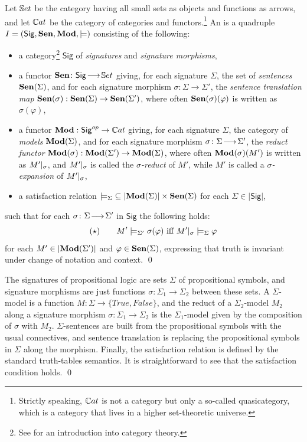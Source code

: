 \documentclass[10pt,fleqn,final]{scrreprt}
\newcommand{\cbs}[0]{\color{red}\xspace} %
\newcommand{\cbe}[0]{\color{black}\xspace} %
\newcommand{\Sig}{\mathsf{Sig}}
\newenvironment{definitions}[0]{\medskip }{}
\begin{document}
\begin{definitions}
\begin{definition}\label{def:inst} \cbs Let $\mathbb{S}et$ be the
category having all small \textsc{}sets as objects and functions as
arrows, and let $\mathbb{C}at$ be the category
of categories and functors.\footnote {Strictly speaking, $\mathbb{C}at$ is not a
category but only a so-called quasicategory, which is a category that
lives in a higher set-theoretic universe.}\cbe
An
 \cite{GoguenBurstall92} is a quadruple $I=(\Sig,\sen,\IMod,{\models})$
consisting of the following:
%
\begin{itemize}
\item a category\footnote{See \cite{AHS,MacLane} for an introduction into category theory.} $\Sig$ of \emph{signatures} and \emph{signature morphisms},
\item a functor $\sen\map{\Sig}{\Set}$  giving, for each signature $\Sigma$, the set of
\emph{sentences} $\mathbf {Sen}(\Sigma)$, and for each signature morphism
$\sigma:{\Sigma}\to{\Sigma'}$, the \emph{sentence translation map}
$\mathbf {Sen}(\sigma):{\mathbf {Sen}(\Sigma)}\to{\mathbf {Sen}(\Sigma')}$, where often
$\mathbf {Sen}(\sigma)(\varphi)$ is written as $\sigma(\varphi)$, \item a
functor $\IMod:{\Sig^{op}}\to{\Cat}$ giving, for each signature
$\Sigma$, the category of \emph{models} $\mathbf{Mod}(\Sigma)$, and for each
signature morphism $\sigma\colon\Sigma\!\longrightarrow\!\Sigma'$, the \emph{reduct
functor\/} $\mathbf{Mod}(\sigma):{\mathbf{Mod}(\Sigma')}\to {\mathbf{Mod}(\Sigma)}$, where
often $\mathbf{Mod}(\sigma)(M')$ is written as $M'|_{\sigma}$, and
$M'|_{\sigma}$ is called the \emph{$\sigma$-reduct} of $M'$,
while $M'$ is called a \emph{$\sigma$-expansion} of
$M'|_{\sigma}$,
\item a satisfaction relation
${\models_{\Sigma}}\subseteq|{\mathbf{Mod}(\Sigma)|\times\mathbf {Sen}(\Sigma)}$ for
each $\Sigma\in |\Sig|$,
\end{itemize}
%
such that for each $\sigma\colon\Sigma\!\longrightarrow\!\Sigma'$ in $\Sig$ the following  holds:
$$
(\star) \qquad M'\models_{\Sigma'}\sigma(\varphi) \mbox{ iff }
M'|_{\sigma} \models_{\Sigma} \varphi
$$
for each $M'\in |\mathbf{Mod}(\Sigma')|$ and $\varphi\in \mathbf {Sen}(\Sigma)$,
expressing that truth is invariant under change of notation and
context.  \qed
\end{definition}

\begin{definition}\label{Prop}
The signatures of propositional logic are sets $\Sigma$ of propositional symbols, and signature morphisms are just
functions $\sigma:{\Sigma_1}\to{\Sigma_2}$ between these sets. 
A $\Sigma$-model is a function $M : {\Sigma}\to{\{True, False\}}$, and the reduct of a 
$\Sigma_2$-model $M_2$ along a signature morphism $\sigma:{\Sigma_1}\to{\Sigma_2}$ is 
the $\Sigma_1$-model given by the composition of $\sigma$ with $M_2$. $\Sigma$-sentences are built from the
propositional symbols with the usual connectives, and sentence translation is replacing the propositional
symbols in $\Sigma$ along the morphism. Finally, the satisfaction relation is defined by the standard truth-tables
semantics. It is straightforward to see that the satisfaction condition holds.
\qed\end{definition}



\end{definitions}
\end{document}
